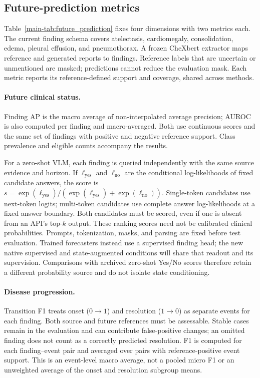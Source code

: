 \subsection{Future-prediction metrics}

Table~\ref{main-tab:future_prediction} fixes four dimensions with two metrics each. The current finding schema covers atelectasis, cardiomegaly, consolidation, edema, pleural effusion, and pneumothorax. A frozen CheXbert extractor maps reference and generated reports to findings. Reference labels that are uncertain or unmentioned are masked; predictions cannot reduce the evaluation mask. Each metric reports its reference-defined support and coverage, shared across methods.

\paragraph{Future clinical status.}
Finding AP is the macro average of non-interpolated average precision; AUROC is also computed per finding and macro-averaged. Both use continuous scores and the same set of findings with positive and negative reference support. Class prevalence and eligible counts accompany the results.

For a zero-shot VLM, each finding is queried independently with the same source evidence and horizon. If $\ell_{\mathrm{yes}}$ and $\ell_{\mathrm{no}}$ are the conditional log-likelihoods of fixed candidate answers, the score is $s=\exp(\ell_{\mathrm{yes}})/(\exp(\ell_{\mathrm{yes}})+\exp(\ell_{\mathrm{no}}))$. Single-token candidates use next-token logits; multi-token candidates use complete answer log-likelihoods at a fixed answer boundary. Both candidates must be scored, even if one is absent from an API's top-$k$ output. These ranking scores need not be calibrated clinical probabilities. Prompts, tokenization, masks, and parsing are fixed before test evaluation. Trained forecasters instead use a supervised finding head; the new native supervised and state-augmented conditions will share that readout and its supervision. Comparisons with archived zero-shot Yes/No scores therefore retain a different probability source and do not isolate state conditioning.

\paragraph{Disease progression.}
Transition F1 treats onset ($0\rightarrow1$) and resolution ($1\rightarrow0$) as separate events for each finding. Both source and future references must be assessable. Stable cases remain in the evaluation and can contribute false-positive changes; an omitted finding does not count as a correctly predicted resolution. F1 is computed for each finding--event pair and averaged over pairs with reference-positive event support. This is an event-level macro average, not a pooled micro F1 or an unweighted average of the onset and resolution subgroup means.

